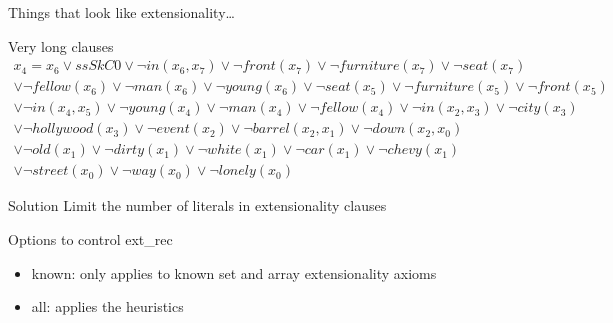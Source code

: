 \begin{frame}{Things that look like extensionality\dots}
  \begin{block}{Very long clauses}
    {\scriptsize
    \begin{gather*}
    x_4 = x_6 \lor ssSkC0 \lor \neg in(x_6 , x_7 ) \lor \neg front(x_7
    ) \lor \neg furniture(x_7 ) \lor \neg seat(x_7 ) \\ \lor \neg
    fellow (x_6 ) \lor \neg man(x_6 ) \lor \neg young(x_6 ) \lor \neg
    seat(x_5 ) \lor \neg furniture(x_5 ) \lor \neg front(x_5 ) \\ \lor
    \neg in(x_4 , x_5 ) \lor \neg young(x_4 ) \lor \neg man(x_4 ) \lor
    \neg fellow (x_4 ) \lor \neg in(x_2 , x_3 ) \lor \neg city(x_3 )
    \\ \lor \neg hollywood (x_3 ) \lor \neg event(x_2 ) \lor \neg
    barrel (x_2 , x_1 ) \lor \neg down(x_2 , x_0 ) \\ \lor \neg old
    (x_1 ) \lor \neg dirty(x_1 ) \lor \neg white(x_1 ) \lor \neg car
    (x_1 ) \lor \neg chevy(x_1 ) \\ \lor \neg street(x_0 ) \lor \neg
    way(x_0 ) \lor \neg lonely(x_0 )
    \end{gather*}
    }
  \end{block}

  \begin{block}{Solution}
    Limit the number of literals in extensionality clauses
  \end{block}
\end{frame}

\begin{frame}{Options to control ext\_rec}
  \begin{itemize}
  \item known: only applies to known set and array extensionality axioms
  \item all: applies the heuristics
  \end{itemize}
\end{frame}
